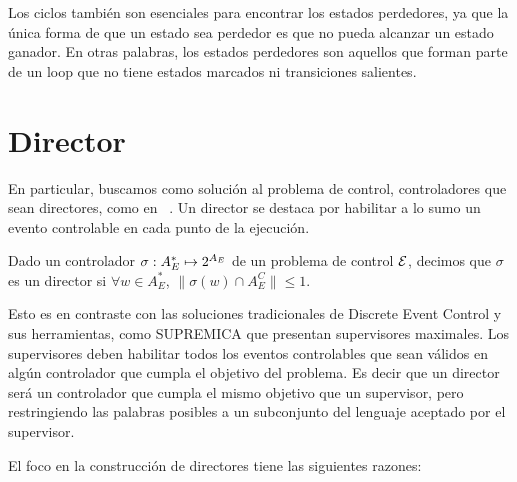 Los ciclos también son esenciales para encontrar los estados perdedores, ya que la única forma de que un estado sea perdedor es que no pueda alcanzar un estado ganador. En otras palabras, los estados perdedores son aquellos que forman parte de un loop que no tiene estados marcados ni transiciones salientes.


\section{Director} \label{chpt:director}
En particular, buscamos como solución al problema de control, controladores que sean directores, como en ~\cite{Huang:2007:Optimal,Huang:2008:DCD}. Un director se destaca por habilitar a lo sumo un evento controlable en cada punto de la ejecución. 

\begin{definition}[Director] \label{def:director}
	Dado un controlador $\sigma : A_E^* \mapsto 2^{A_E}$ de un problema de control $\mathcal{E}$, decimos que $\sigma$ es un director si $\forall w \in A_E^*$, $\|\sigma(w) \cap A_E^C\| \leq 1$.	
\end{definition}

Esto es en contraste con las soluciones tradicionales de Discrete Event Control y sus herramientas, como SUPREMICA \cite{Mohajerani:2014:Supremica} que presentan supervisores maximales. Los supervisores deben habilitar todos los eventos controlables que sean válidos en algún controlador que cumpla el objetivo del problema. Es decir que un director será un controlador que cumpla el mismo objetivo que un supervisor, pero restringiendo las palabras posibles a un subconjunto del lenguaje aceptado por el supervisor.

El foco en la construcción de directores tiene las siguientes razones:

